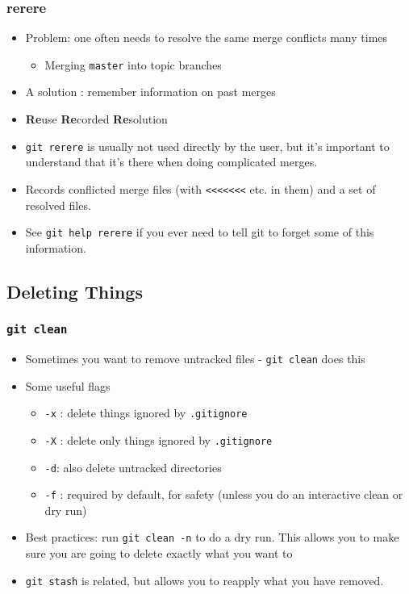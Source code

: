 \documentclass{beamer}
\begin{document}
\begin{frame}[fragile]
\frametitle{rerere}
\begin{itemize}
\item Problem: one often needs to resolve the same merge conflicts many times
\begin{itemize}
\item Merging \texttt{master} into topic branches
\end{itemize}
\item A solution : remember information on past merges
\item \textbf{Re}use \textbf{Re}corded \textbf{Re}solution
\item \lstinline{git rerere} is usually not used directly by the user, but it's important to understand that it's there when doing complicated merges.
\item Records conflicted merge files (with \texttt{<<<<<<<} etc. in them) and a set of resolved files.
\item See \texttt{git help rerere} if you ever need to tell git to forget some of this information.
\end{itemize}
\end{frame}

\subsection{Deleting Things}

\begin{frame}[fragile]
\frametitle{\texttt{git clean}}
\begin{itemize}
\item Sometimes you want to remove untracked files - \lstinline{git clean} does this
\item Some useful flags
\begin{itemize}
\item \lstinline{-x} : delete things ignored by \texttt{.gitignore}
\item \lstinline{-X} : delete only things ignored by \texttt{.gitignore}
\item \lstinline{-d}: also delete untracked directories
\item \lstinline{-f} : required by default, for safety (unless you do an interactive clean or dry run)
\end{itemize}
\item Best practices: run \lstinline{git clean -n} to do a dry run. This allows you to make sure you are going to delete exactly what you want to
\item \lstinline{git stash} is related, but allows you to reapply what you have removed.
\end{itemize}
\end{frame}
\end{document}

